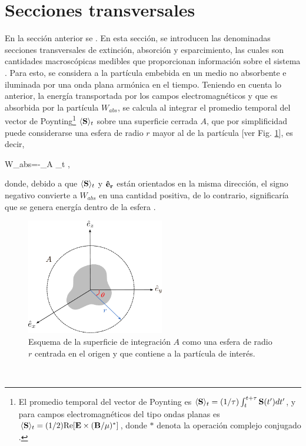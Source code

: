 

\section{Secciones transversales}
\label{section:yth}

En la sección anterior se . En esta sección, se introducen las denominadas secciones transversales de extinción, absorción y esparcimiento, las cuales son cantidades macroscópicas medibles que proporcionan información sobre el sistema \cite{bohrenAbsorptionScatteringLight2008}. Para esto, se considera a la partícula embebida en un medio no absorbente e iluminada por una onda plana armónica en el tiempo. Teniendo en cuenta lo anterior, la energía transportada por los campos electromagnéticos y que es absorbida por la partícula $W_{abs}$, se calcula al integrar el promedio temporal del vector de Poynting\footnote{El promedio temporal del vector de Poynting es $\langle\vb{S}\rangle_t = (1/\tau)\int_t^{t+\tau}\vb{S}(t')dt'$, y para campos electromagnéticos del tipo ondas planas es $\langle\vb{S}\rangle_t = (1/2) \text{Re}[\vb{E} \times (\vb{B}/\mu)^{*}]$, donde $*$ denota la operación complejo conjugado \cite{bohrenAbsorptionScatteringLight2008}. } $\langle\vb{S}\rangle_t$  sobre una superficie cerrada $A$, que por simplificidad puede considerarse una esfera de radio $r$ mayor al de la partícula [ver Fig. \ref{WA}], es decir, 
\begin{tcolorbox}
	W_{abs}=-\int_A \langle{}\rangle_t\cdot{} ,
	\label{flujopoynting}
\end{tcolorbox}
donde, debido a que $\langle\vb{S}\rangle_t$ y $\vb{\hat{e}_r}$ están orientados en la misma dirección, el signo negativo convierte a $W_{abs}$ en una cantidad positiva, de lo contrario, significaría que se genera energía dentro de la esfera \cite{bohrenAbsorptionScatteringLight2008}.
%
\begin{figure}[h]
	\centering
	\includegraphics[width=6cm]{../../Figuras/WA.pdf}
	\caption{Esquema de la superficie de integración $A$ como una esfera de radio $r$ centrada en el origen y que contiene a la partícula de interés.}
	\label{WA}
\end{figure}
\\

